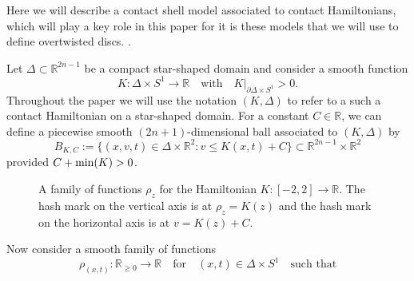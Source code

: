 \documentclass[12pt]{paper}
\theoremstyle{plain}
\theoremstyle{definition}
\newcommand{\p}{\partial}
\newcommand{\R}{{\mathbb{R}}}
\renewcommand{\min}{{\rm min}}
\newcommand{\CCont}{\mathrm{Cont}}
\numberwithin{figure}{section}
\begin{document}
Here we will describe a contact shell model associated to contact Hamiltonians, which will play a key role in this paper
for it is these models that we will  use to define overtwisted discs.   .

Let $\Delta \subset \R^{2n-1}$ be a compact star-shaped domain and consider a smooth function
\begin{equation}\label{e:KBoundary}
	K: \Delta \times S^1 \to \R \quad\mbox{with}\quad K|_{\partial \Delta \times S^1} > 0.
\end{equation}
Throughout the paper we will use the notation $(K, \Delta)$ to refer to a such a contact Hamiltonian 
on a star-shaped domain.
For a constant $C \in \R$, we can define a piecewise smooth $(2n+1)$-dimensional ball associated to $(K, \Delta)$ by
\begin{equation}\label{e:S1ball}
	B_{K,C} := \{(x,v,t) \in \Delta \times \R^2 : v \leq K(x,t)+C\} \subset \R^{2n-1} \times \R^2
\end{equation}
provided $C + \min(K) > 0$.
\begin{figure}[h]
   \centering
   \def\svgwidth{400pt}
   
   \caption{A family of functions $\rho_z$ for the Hamiltonian $K: [-2,2] \to \R$.
   The hash mark on the vertical axis is at $\rho_z = K(z)$ and the hash mark on the horizontal axis is at $v = K(z) + C$.}
   \label{f:Rho}
  \label{f:embedHamiltonian2a}
\end{figure}
Now consider a smooth family of functions
\begin{equation}\label{e:FamilyRhoS1}
	\rho_{(x,t)}: \R_{\geq 0} \to \R \quad\mbox{for}\quad (x,t) \in \Delta \times S^1 \quad\mbox{such that}
\end{equation}
\end{document}
